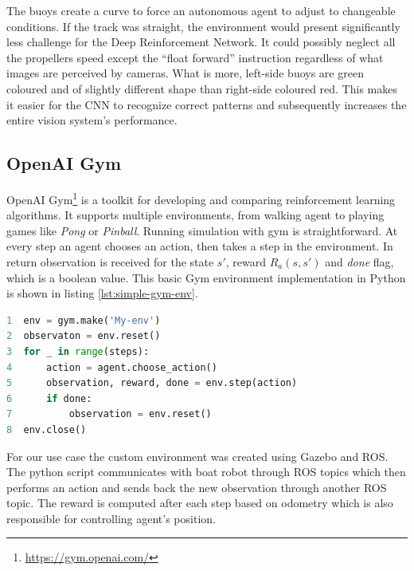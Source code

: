The buoys create a curve to force an autonomous agent to adjust to changeable conditions. If the track was straight, the environment would present significantly less challenge for the Deep Reinforcement Network. It could possibly neglect all the propellers speed except the ``float forward'' instruction regardless of what images are perceived by cameras. What is more, left-side buoys are green coloured and of slightly different shape than right-side coloured red. This makes it easier for the CNN to recognize correct patterns and subsequently increases the entire vision system's performance.

\newpage

\subsection{OpenAI Gym}
\label{sub:openai-gym}

OpenAI Gym\footnote{\url{https://gym.openai.com/}} is a toolkit for developing and comparing reinforcement learning algorithms. It supports multiple environments, from walking agent to playing games like \emph{Pong} or \emph{Pinball}. Running simulation with gym is straightforward. At every step an agent chooses an action, then takes a step in the environment. In return observation is received for the state $s'$, reward $R_a(s, s')$ and \emph{done} flag, which is a boolean value. This basic
Gym environment implementation in Python is shown in listing \ref{lst:simple-gym-env}.

\begin{lstlisting}[language=Python, caption={Example gym environment simulation}, label={lst:simple-gym-env}]
1  env = gym.make('My-env')
2  observaton = env.reset()
3  for _ in range(steps):
4      action = agent.choose_action()
5      observation, reward, done = env.step(action)
6      if done:
7          observation = env.reset()
8  env.close()
\end{lstlisting}

For our use case the custom environment was created using Gazebo and ROS. The python script communicates with boat robot through ROS topics which then performs an action and sends back the new observation through another ROS topic. The reward is computed after each step based on odometry which is also responsible for controlling agent's position.

